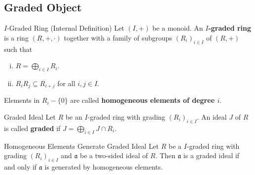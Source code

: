 \subsection{Graded Object}
\begin{definition}{$I$-Graded Ring (Internal Definition)}{}
    Let $(I,+)$ be a monoid. An \textbf{$I$-graded ring} is a ring $(R,+,\cdot)$ together with a family of subgroups $(R_i)_{i\in I}$ of $(R,+)$ such that
    \begin{enumerate}[(i)]
        \item $R=\bigoplus_{i\in I}R_i$.
        \item $R_iR_j\subseteq R_{i+j}$ for all $i,j\in I$.
    \end{enumerate}
    Elements in $R_i-\{0\}$ are called \textbf{homogeneous elements of degree $i$}.
\end{definition}

\begin{definition}{Graded Ideal}{}
    Let $R$ be an $I$-graded ring with grading $(R_i)_{i\in I}$. An ideal $J$ of $R$ is called \textbf{graded} if $J=\bigoplus_{i\in I}J\cap R_i$.
\end{definition}

\begin{proposition}{Homogeneous Elements Generate Graded Ideal}{}
    Let $R$ be a $I$-graded ring with grading $(R_i)_{i\in I}$ and $\mathfrak{a}$ be a two-sided ideal of $R$. Then $\mathfrak{a}$ is a graded ideal if and only if $\mathfrak{a}$ is generated by homogeneous elements.
\end{proposition}

